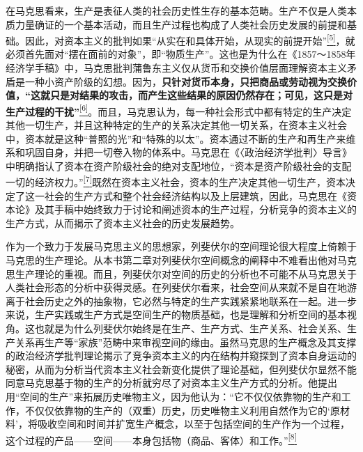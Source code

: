 \documentclass[UTF8, fontset = sourcesans, a4paper, oneside, zihao =
-4, scheme=chinese, no-math, space=true]{ctexbook}
\begin{document}
在马克思看来，生产是表征人类的社会历史性生存的基本范畴。生产不仅是人类本质力量确证的一个基本活动，而且生产过程也构成了人类社会历史发展的前提和基础。因此，对资本主义的批判如果``从实在和具体开始，从现实的前提开始''\protect\hypertarget{part0007_split_001.htmlux5cux23w5}{}{}\protect\hyperlink{part0007_split_004.htmlux5cux23m5}{\textsuperscript{{[}5{]}}}，就必须首先面对``摆在面前的对象''，即``物质生产''。这也是为什么在《1857～1858年经济学手稿》中，马克思批判蒲鲁东主义仅从货币和交换价值层面理解资本主义矛盾是一种小资产阶级的幻想。因为，\textbf{只针对货币本身，只把商品或劳动视为交换价值，``这就只是对结果的攻击，而产生这些结果的原因仍然存在；可见，这只是对生产过程的干扰''}\protect\hypertarget{part0007_split_001.htmlux5cux23w6}{}{}\protect\hyperlink{part0007_split_004.htmlux5cux23m6}{\textsuperscript{{[}6{]}}}。而且，马克思认为，每一种社会形式中都有特定的生产决定其他一切生产，并且这种特定的生产的关系决定其他一切关系，在资本主义社会中，资本就是这种``普照的光''和``特殊的以太''。资本通过不断的生产和再生产来维系和巩固自身，并把一切卷入物的体系中。马克思在《〈政治经济学批判〉导言》中明确指认了资本在资产阶级社会的绝对支配地位，``资本是资产阶级社会的支配一切的经济权力。''\protect\hypertarget{part0007_split_001.htmlux5cux23w7}{}{}\protect\hyperlink{part0007_split_004.htmlux5cux23m7}{\textsuperscript{{[}7{]}}}既然在资本主义社会，资本的生产决定其他一切生产，资本决定了这一社会的生产方式和整个社会经济结构以及上层建筑，因此，马克思在《资本论》及其手稿中始终致力于讨论和阐述资本的生产过程，分析竞争的资本主义的生产方式，从而揭示了资本主义社会的历史发展趋势。

作为一个致力于发展马克思主义的思想家，列斐伏尔的空间理论很大程度上倚赖于马克思的生产理论。从本书第二章对列斐伏尔空间概念的阐释中不难看出他对马克思生产理论的重视。而且，列斐伏尔对空间的历史的分析也不可能不从马克思关于人类社会形态的分析中获得灵感。在列斐伏尔看来，社会空间从来就不是自在地游离于社会历史之外的抽象物，它必然与特定的生产实践紧紧地联系在一起。进一步来说，生产实践或生产方式是空间生产的物质基础，也是理解和分析空间的基本视角。这也就是为什么列斐伏尔始终是在生产、生产方式、生产关系、社会关系、生产关系再生产等``家族''范畴中来审视空间的缘由。虽然马克思的生产概念及其支撑的政治经济学批判理论揭示了竞争资本主义的内在结构并窥探到了资本自身运动的秘密，从而为分析当代资本主义社会新变化提供了理论基础，但列斐伏尔显然不能同意马克思基于物的生产的分析就穷尽了对资本主义生产方式的分析。他提出用``空间的生产''来拓展历史唯物主义，因为他认为：``它不仅仅依靠物的生产和工作，不仅仅依靠物的生产的（双重）历史，历史唯物主义利用自然作为它的`原材料'，将吸收空间和时间并扩宽生产概念，以至于包括空间的生产作为一个过程，这个过程的产品------空间------本身包括物（商品、客体）和工作。''\protect\hypertarget{part0007_split_001.htmlux5cux23w8}{}{}\protect\hyperlink{part0007_split_004.htmlux5cux23m8}{\textsuperscript{{[}8{]}}}
\end{document}
